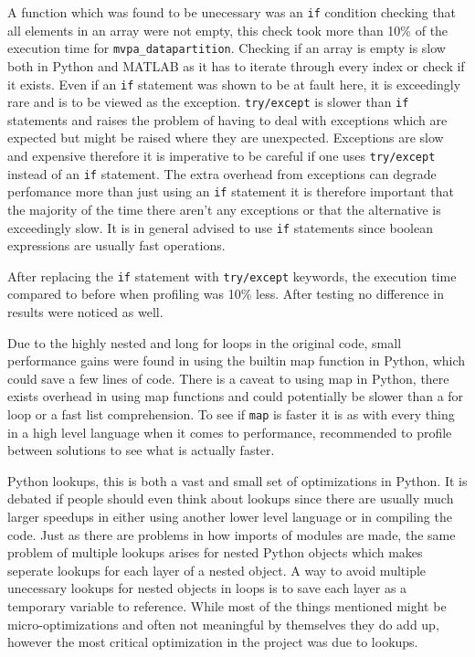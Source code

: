 \documentclass[12pt, a4paper]{article}
\begin{document}
A function which was found to be unecessary was an \texttt{if} condition checking that all elements in an array were not empty, this check took more than 10\% of the execution time for \texttt{mvpa\_datapartition}.
Checking if an array is empty is slow both in Python and MATLAB as it has to iterate through every index or check if it exists.
Even if an \texttt{if} statement was shown to be at fault here, it is exceedingly rare and is to be viewed as the exception.
\texttt{try/except} is slower than \texttt{if} statements and raises the problem of having to deal with exceptions which are expected but might be raised where they are unexpected.
Exceptions are slow and expensive therefore it is imperative to be careful if one uses \texttt{try/except} instead of an \texttt{if} statement.
The extra overhead from exceptions can degrade perfomance more than just using an \texttt{if} statement it is therefore important that the majority of the time there aren't any exceptions or that the alternative is exceedingly slow.
It is in general advised to use \texttt{if} statements since boolean expressions are usually fast operations.

After replacing the \texttt{if} statement with \texttt{try/except} keywords, the execution time compared to before when profiling was 10\% less.
After testing no difference in results were noticed as well.%

Due to the highly nested and long for loops in the original code, small performance gains were found in using the builtin map function in Python, which could save a few lines of code.
There is a caveat to using map in Python, there exists overhead in using map functions and could potentially be slower than a for loop or a fast list comprehension. 
To see if \texttt{map} is faster it is as with every thing in a high level language when it comes to performance, recommended to profile between solutions to see what is actually faster.


Python lookups, this is both a vast and small set of optimizations in Python.
It is debated if people should even think about lookups since there are usually much larger speedups in either using another lower level language or in compiling the code.
Just as there are problems in how imports of modules are made, the same problem of multiple lookups arises for nested Python objects which makes seperate lookups for each layer of a nested object.
A way to avoid multiple unecessary lookups for nested objects in loops is to save each layer as a temporary variable to reference.
While most of the things mentioned might be micro-optimizations and often not meaningful by themselves they do add up, however the most critical optimization in the project was due to lookups.
\end{document}
